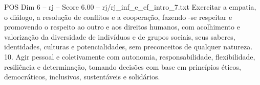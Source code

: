 \begin{textsample}{POS Dim 6 – rj – Score 6.00 – rj/rj\_inf\_e\_ef\_intro\_7.txt}
Exercitar a empatia, o diálogo, a resolução de conflitos e a cooperação, fazendo -se respeitar e promovendo o respeito ao outro e aos direitos humanos, com acolhimento e valorização da diversidade de indivíduos e de grupos sociais, seus saberes, identidades, culturas e potencialidades, sem preconceitos de qualquer natureza. 10.
Agir pessoal e coletivamente com autonomia, responsabilidade, flexibilidade, resiliência e determinação, tomando decisões com base em princípios éticos, democráticos, inclusivos, sustentáveis e solidários.

\end{textsample}
